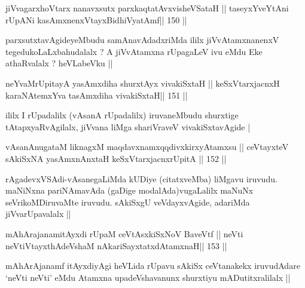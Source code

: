 \begin{shl}
jiVvagarxhoV\s tarx nanavxsutx parxkaqtatAvxvisheVSataH ||
taseyxYveYtAni rUpANi kasAmxnenxVtayxBidhiVyatAmf\hfill || 150 ||
\end{shl}

\begin{artha}
parxsutxtavAgideyeMbudu samAnavAdadxriMda ililx jiVvAtamxnanenxV
tegedukoLaLxbahudalalx ? A jiVvAtamxna rUpagaLeV ivu eMdu Eke 
athaRvalalx ? heVLabeVku ||
\end{artha}

\begin{shl}
neYvaMrUpitayA yasAmxdiha shurxtAyx vivakiSxtaH ||
keSxVtarxjacnxH karaNAtemxYva tasAmxdiha vivakiSxtaH\hfill || 151 ||
\end{shl}

\begin{artha}
ililx I rUpadalilx (vAsanA rUpadalilx) iruvaneMbudu shurxtige
tAtapxyaRvAgilalx, jiVvana liMga shariVraveV vivakiSxtavAgide |
\end{artha}


\begin{shl}
vAsanAnugataM liknagxM maqdavxnamxqqdivxkirxyAtamxsu ||
ceVtayxteV sAkiSxNA yasAmxnAnxtaH keSxVtarxjacnxrUpitA \hfill || 152 ||
\end{shl}

\begin{artha}
rAgadevxVSAdi-vAsanegaLiMda kUDiye (citatxveMba) liMgavu iruvudu.
maNiNxna pariNAmavAda (gaDige modalAda)vugaLalilx maNuNx
seVrikoMDiruvaMte iruvudu. sAkiSxgU veVdayxvAgide, adariMda
jiVvarUpavalalx ||
\end{artha}


\begin{shl}
mAhArajanamitAyxdi rUpaM ceVtAsxkiSxNoV BaveVtf ||
neVti neVtiVtayxthA\s\s deVshaM nAkariSayxtatxdA\s\s tamxnaH\hfill || 153 ||
\end{shl}

\begin{artha}
mAhArAjanamf itAyxdiyAgi heVLida rUpavu sAkiSx ceVtanakekx iruvudAdare
`neVti neVti' eMdu Atamxna upadeVshavanunx shurxtiyu mADutitxralilalx
||
\end{artha}


